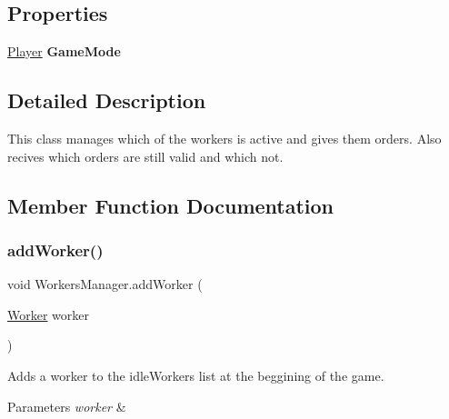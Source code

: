 \subsection*{Properties}
\begin{DoxyCompactItemize}
\item 
\mbox{\label{class_workers_manager_a347ee1bef7154226d46273026c9a463e}} 
\mbox{\hyperlink{class_player}{Player}} {\bfseries Game\+Mode}
\end{DoxyCompactItemize}


\subsection{Detailed Description}
This class manages which of the workers is active and gives them orders. Also recives which orders are still valid and which not. 



\subsection{Member Function Documentation}
\mbox{\label{class_workers_manager_afd831423d7d42862a269d6a92768e5c3}} 
\subsubsection{\texorpdfstring{add\+Worker()}{addWorker()}}
{\footnotesize\ttfamily void Workers\+Manager.\+add\+Worker (\begin{DoxyParamCaption}\item[{\mbox{\hyperlink{class_worker}{Worker}}}]{worker }\end{DoxyParamCaption})}



Adds a worker to the idle\+Workers list at the beggining of the game. 


\begin{DoxyParams}{Parameters}
{\em worker} & \\
\hline
\end{DoxyParams}
\mbox{\label{class_workers_manager_adadd929b4978dfbe975ccb733d031bf9}} 
